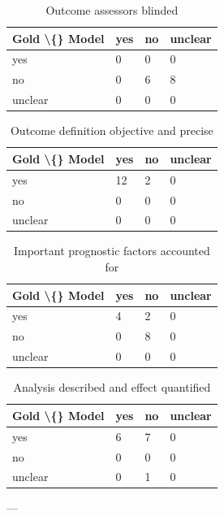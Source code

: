 \documentclass[11pt,a4paper]{article}
\begin{document}
\begin{table}[H]
\centering
\caption{Outcome assessors blinded}
\label{tab:supp_37}
\begin{tabular}{llll}
\toprule
Gold \textbackslash\{\} Model & yes & no & unclear \\
\midrule
yes & 0 & 0 & 0 \\
no & 0 & 6 & 8 \\
unclear & 0 & 0 & 0 \\
\bottomrule
\end{tabular}
\end{table}

\begin{table}[H]
\centering
\caption{Outcome definition objective and precise}
\label{tab:supp_38}
\begin{tabular}{llll}
\toprule
Gold \textbackslash\{\} Model & yes & no & unclear \\
\midrule
yes & 12 & 2 & 0 \\
no & 0 & 0 & 0 \\
unclear & 0 & 0 & 0 \\
\bottomrule
\end{tabular}
\end{table}

\begin{table}[H]
\centering
\caption{Important prognostic factors accounted for}
\label{tab:supp_39}
\begin{tabular}{llll}
\toprule
Gold \textbackslash\{\} Model & yes & no & unclear \\
\midrule
yes & 4 & 2 & 0 \\
no & 0 & 8 & 0 \\
unclear & 0 & 0 & 0 \\
\bottomrule
\end{tabular}
\end{table}

\begin{table}[H]
\centering
\caption{Analysis described and effect quantified}
\label{tab:supp_40}
\begin{tabular}{llll}
\toprule
Gold \textbackslash\{\} Model & yes & no & unclear \\
\midrule
yes & 6 & 7 & 0 \\
no & 0 & 0 & 0 \\
unclear & 0 & 1 & 0 \\
\bottomrule
\end{tabular}
\end{table}

---
\end{document}
